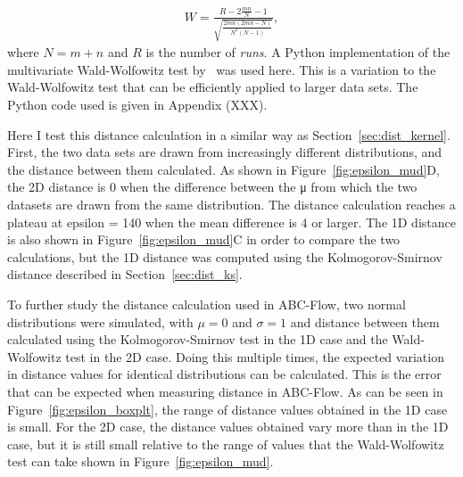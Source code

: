 \begin{align}
W = \frac{R - 2\frac{mn}{N}-1}{\sqrt{\frac{2mn(2mn-N)}{N^2(N-1)}}},
\end{align}
where $N = m + n$ and $R$ is the number of \textit{runs}. A Python implementation of the multivariate Wald-Wolfowitz test by~\textcite{Monaco:2014wx} was used here. This is a variation to the Wald-Wolfowitz test that can be efficiently applied to larger data sets. The Python code used is given in Appendix (XXX).


Here I test this distance calculation in a similar way as Section~\ref{sec:dist_kernel}. First, the two data sets are drawn from increasingly different distributions, and the distance between them calculated. As shown in Figure~\ref{fig:epsilon_mud}D, the 2D distance is 0 when the difference between the μ from which the two datasets are drawn from the same distribution. The distance calculation reaches a plateau at epsilon = 140 when the mean difference is 4 or larger. The 1D distance is also shown in Figure~\ref{fig:epsilon_mud}C in order to compare the two calculations, but the 1D distance was computed using the Kolmogorov-Smirnov distance described in Section~\ref{sec:dist_ks}.

To further study the distance calculation used in ABC-Flow, two normal distributions were simulated, with $\mu=0$ and $\sigma=1$ and distance between them calculated using the Kolmogorov-Smirnov test in the 1D case and the Wald-Wolfowitz test in the 2D case. Doing this multiple times, the expected variation in distance values for identical distributions can be calculated. This is the error that can be expected when measuring distance in ABC-Flow. As can be seen in Figure~\ref{fig:epsilon_boxplt}, the range of distance values obtained in the 1D case is small. For the 2D case, the distance values obtained vary more than in the 1D case, but it is still small relative to the range of values that the Wald-Wolfowitz test can take shown in Figure~\ref{fig:epsilon_mud}. 

